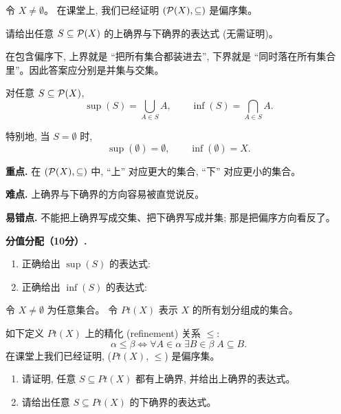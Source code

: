 \documentclass[a4paper, justified]{tufte-handout}
\begin{document}
\newpage
\begin{problem}
  令 $X \neq \emptyset$。
  在课堂上, 我们已经证明 $(\mathcal{P}(X), \subseteq)$ 是偏序集。

  \noindent 请给出任意 $S \subseteq \mathcal{P}(X)$ 的上确界与下确界的表达式
  (无需证明)。
\end{problem}

\begin{solution}
  \begin{intention}
    在包含偏序下, 上界就是 ``把所有集合都装进去'', 下界就是 ``同时落在所有集合里''。因此答案应分别是并集与交集。
  \end{intention}

  对任意 $S \subseteq \mathcal{P}(X)$,
  \[
    \sup(S) = \bigcup_{A \in S} A,
    \qquad
    \inf(S) = \bigcap_{A \in S} A.
  \]

  特别地, 当 $S = \emptyset$ 时,
  \[
    \sup(\emptyset) = \emptyset,
    \qquad
    \inf(\emptyset) = X.
  \]

  \begin{remark}
    \textbf{重点.} 在 $(\mathcal{P}(X), \subseteq)$ 中, ``上'' 对应更大的集合, ``下'' 对应更小的集合。\par
    \textbf{难点.} 上确界与下确界的方向容易被直觉说反。\par
    \textbf{易错点.} 不能把上确界写成交集、把下确界写成并集; 那是把偏序方向看反了。
  \end{remark}

  \textbf{分值分配（10分）.}
  \begin{enumerate}[(1)]
    \item 正确给出 $\sup(S)$ 的表达式: 
    \item 正确给出 $\inf(S)$ 的表达式: 
  \end{enumerate}
\end{solution}

\newpage
\begin{problem}[集合划分与精化关系]
  令 $X \neq \emptyset$ 为任意集合。
  令 $Pt(X)$ 表示 $X$ 的所有划分组成的集合。

  \noindent 如下定义 $Pt(X)$ 上的精化 (refinement) 关系 $\le$:
  \[
    \alpha \le \beta \iff
      \forall A \in \alpha\; \exists B \in \beta\; A \subseteq B.
  \]
  在课堂上我们已经证明, ($Pt(X)$, $\le$) 是偏序集。


  \begin{enumerate}[(1)]
    \item 请证明, 任意 $S \subseteq Pt(X)$ 都有上确界, 并给出上确界的表达式。
    \item 请给出任意 $S \subseteq Pt(X)$ 的下确界的表达式。
  \end{enumerate}
\end{problem}
\end{document}
